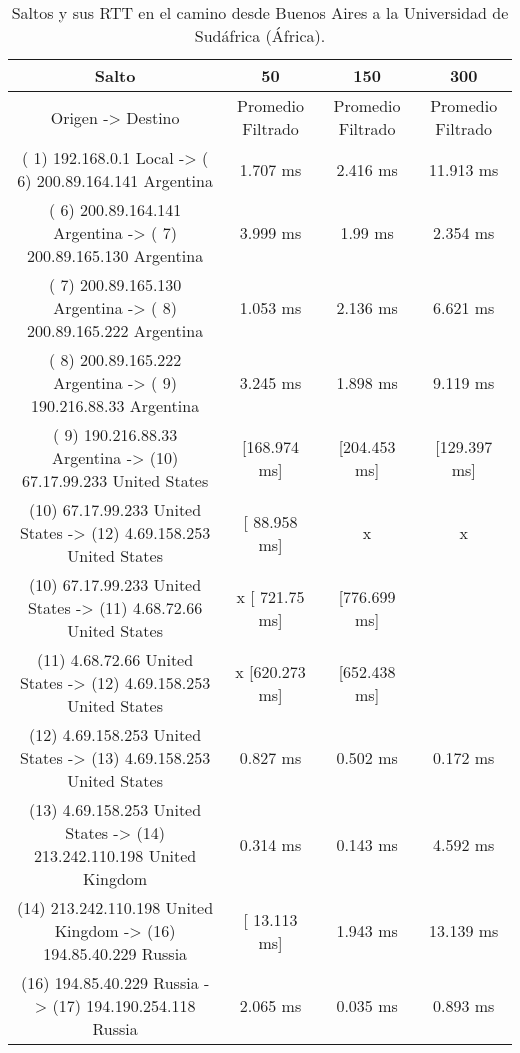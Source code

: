 \begin{table}[]
\centering
\caption{Saltos y sus RTT en el camino desde Buenos Aires a la Universidad de Sudáfrica (África).}
\begin{tabular}{ | c | c | c | c | }
	\hline 
Salto	& 50	& 150	& 300 \\ \hline
Origen                ->               Destino               	                 & Promedio Filtrado	 & Promedio Filtrado&	Promedio Filtrado\\ \hline
( 1) 192.168.0.1     Local           -> ( 6) 200.89.164.141  Argentina     & 	     1.707 ms   	 &    2.416 ms   	  &  11.913 ms   \\ \hline
( 6) 200.89.164.141  Argentina       -> ( 7) 200.89.165.130  Argentina     & 	     3.999 ms   	 &     1.99 ms   	  &   2.354 ms   \\ \hline
( 7) 200.89.165.130  Argentina       -> ( 8) 200.89.165.222  Argentina     & 	     1.053 ms   	 &    2.136 ms   	  &   6.621 ms   \\ \hline
( 8) 200.89.165.222  Argentina       -> ( 9) 190.216.88.33   Argentina     & 	     3.245 ms   	 &    1.898 ms   	  &   9.119 ms   \\ \hline
( 9) 190.216.88.33   Argentina       -> (10) 67.17.99.233    United States & 	  [168.974 ms]  	 & [204.453 ms]  	  &[129.397 ms]  \\ \hline
(10) 67.17.99.233    United States   -> (12) 4.69.158.253    United States  	 & [ 88.958 ms]       &      	x	         &    x\\ \hline
(10) 67.17.99.233    United States   -> (11) 4.68.72.66      United States & 	x	  [ 721.75 ms]  &	  [776.699 ms]  & \\ \hline
(11) 4.68.72.66      United States   -> (12) 4.69.158.253    United States & 	x	  [620.273 ms]  &	  [652.438 ms]  & \\ \hline
(12) 4.69.158.253    United States   -> (13) 4.69.158.253    United States & 	     0.827 ms   	 &    0.502 ms   	  &   0.172 ms   \\ \hline
(13) 4.69.158.253    United States   -> (14) 213.242.110.198 United Kingdom& 	     0.314 ms   	 &    0.143 ms   	  &   4.592 ms   \\ \hline
(14) 213.242.110.198 United Kingdom  -> (16) 194.85.40.229   Russia        & 	  [ 13.113 ms]  	 &    1.943 ms   	  &  13.139 ms   \\ \hline
(16) 194.85.40.229   Russia          -> (17) 194.190.254.118 Russia        & 	     2.065 ms   	 &    0.035 ms   	  &   0.893 ms   \\ \hline

\end{tabular}
\end{table}
